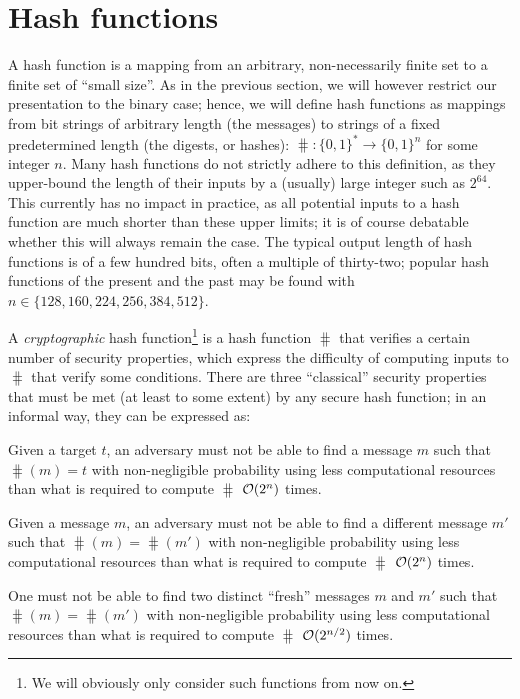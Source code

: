 \section{Hash functions}
\label{sec:intro}

A hash function is a mapping from an arbitrary, non-necessarily finite set to a finite set of ``small size''. As in the previous section, we will however
restrict our presentation to the binary case; hence, we will define hash functions as
mappings from bit strings of arbitrary length (the messages) to strings of a fixed predetermined length (the digests, or hashes):
$\hash : \{0,1\}^* \rightarrow \{0,1\}^n$ for some integer $n$.
Many hash functions do not strictly adhere to this definition, as they upper-bound the length of their inputs by a (usually) large integer such as $2^{64}$. This currently has
no impact in practice, as all potential inputs to a hash function are much shorter than these upper limits; it is of course debatable whether this will always remain the case. 
The typical output length of hash functions is of a few hundred bits, often a multiple of thirty-two; popular hash functions of the present and the past may be found with
$n \in \{128, 160, 224, 256, 384, 512\}$.

A \emph{cryptographic} hash function\footnote{We will obviously only consider such functions from now on.} is a hash function $\hash$ that verifies a certain number of security properties, which express the difficulty of computing inputs
to $\hash$ that verify some conditions. There are three ``classical'' security properties that must be met (at least to some extent)
by any secure hash function; in an informal way, they can be expressed as:
\begin{defi} Given a target $t$, an adversary must not be able to find a message $m$ such that $\hash(m) = t$ with non-negligible probability using
less computational resources than what is required to compute $\hash$ $\operatorname{\mathcal{O}}(2^n)$ times.
\label{def:pre}
\end{defi}
\begin{defi} Given a message $m$, an adversary must not be able to find a different message $m'$ such that
$\hash(m) = \hash(m')$  with non-negligible probability using less computational resources than what is required to compute $\hash$ $\operatorname{\mathcal{O}}(2^n)$ times.
\label{def:2pre}
\end{defi}
\begin{defi} One must not be able to find two distinct ``fresh'' messages $m$ and $m'$ such that $\hash(m) =
\hash(m')$ with non-negligible probability using less computational resources than what is required to compute $\hash$ $\operatorname{\mathcal{O}}(2^{n/2})$ times.
\label{def:coll}
\end{defi}

